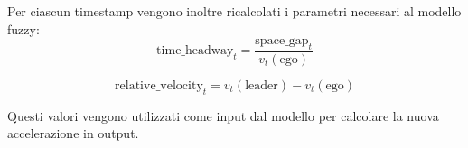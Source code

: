 \vspace{10mm}
\noindent Per ciascun timestamp vengono inoltre ricalcolati i parametri necessari al modello fuzzy:  
\[
\mathrm{time\_headway}_t = \frac{\mathrm{space\_gap}_t}{v_t(\mathrm{ego})}
\]

\[
\mathrm{relative\_velocity}_t = v_t(\mathrm{leader}) - v_t(\mathrm{ego})
\]

\noindent Questi valori vengono utilizzati come input dal modello per calcolare la nuova accelerazione in output.









